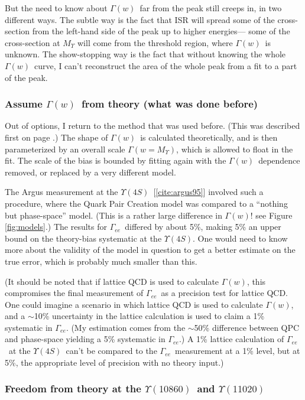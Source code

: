 \documentclass[12pt]{article}
\def\yivs{$\Upsilon(4S)$}
\def\yvs{$\Upsilon(10860)$}
\def\yvis{$\Upsilon(11020)$}
\def\gamee{$\Gamma_{ee}$}
\def\gamofw{$\Gamma(w)$}
\begin{document}
But the need to know about \gamofw\ far from the peak still creeps in,
in two different ways. The subtle way is the fact that ISR will spread
some of the cross-section from the left-hand side of the peak up to
higher energies--- some of the cross-section at $M_\Upsilon$ will come
from the threshold region, where \gamofw\ is unknown. The
show-stopping way is the fact that without knowing the whole \gamofw\ 
curve, I can't reconstruct the area of the whole peak from a fit to a
part of the peak.

\subsubsection{Assume \gamofw\ from theory (what was done before)}

Out of options, I return to the method that was used before. (This was
described first on page \pageref{page:old_method}.) The shape of
\gamofw\ is calculated theoretically, and is then parameterized by an
overall scale $\Gamma(w=\mbox{$M_\Upsilon$})$, which is allowed to
float in the fit. The scale of the bias is bounded by fitting again
with the \gamofw\ dependence removed, or replaced by a very different
model.

The {\sc Argus} measurement at the \yivs\ [\ref{cite:argus95}]
involved such a procedure, where the Quark Pair Creation model was
compared to a ``nothing but phase-space'' model. (This is a rather
large difference in \gamofw! see Figure \ref{fig:models}.) The results
for \gamee\ differed by about 5\%, making 5\% an upper bound on the
theory-bias systematic at the \yivs. One would need to know more about
the validity of the model in question to get a better estimate on the
true error, which is probably much smaller than this.
\label{page:fit_systematic}

(It should be noted that if lattice QCD is used to calculate \gamofw,
this compromises the final measurement of \gamee\ as a precision test
for lattice QCD. One could imagine a scenario in which lattice QCD is
used to calculate \gamofw, and a $\sim$10\% uncertainty in the lattice
calculation is used to claim a 1\% systematic in \gamee. (My
estimation comes from the $\sim$50\% difference between QPC and
phase-space yielding a 5\% systematic in \gamee.) A 1\% lattice
calculation of \gamee\ at the \yivs\ can't be compared to the \gamee\ 
measurement at a 1\% level, but at 5\%, the appropriate level of
precision with no theory input.)

\subsubsection{Freedom from theory at the \yvs\ and \yvis}
\end{document}
